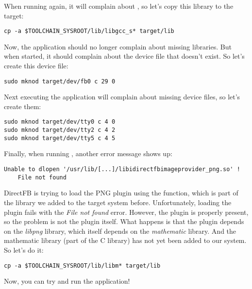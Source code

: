 When running  again, it will complain about
, so let's copy this library to the target:

\begin{verbatim}
cp -a $TOOLCHAIN_SYSROOT/lib/libgcc_s* target/lib
\end{verbatim}

Now, the application should no longer complain about missing
libraries. But when started, it should complain about the 
device file that doesn't exist. So let's create this device file:

\begin{verbatim}
sudo mknod target/dev/fb0 c 29 0
\end{verbatim}

Next executing the application will complain about missing
 device files, so let's create them:

\begin{verbatim}
sudo mknod target/dev/tty0 c 4 0
sudo mknod target/dev/tty2 c 4 2
sudo mknod target/dev/tty5 c 4 5
\end{verbatim}

Finally, when running , another error message shows up:

\small
\begin{verbatim}
Unable to dlopen '/usr/lib/[...]/libidirectfbimageprovider_png.so' !
	File not found
\end{verbatim}
\normalsize

DirectFB is trying to load the PNG plugin using the  function,
which is part of the  library we added to the target system
before. Unfortunately, loading the plugin fails with the {\em File not
found} error. However, the plugin is properly present, so the problem
is not the plugin itself. What happens is that the plugin depends on
the {\em libpng} library, which itself depends on the {\em mathematic}
library. And the mathematic library  (part of the C library) has
not yet been added to our system. So let's do it:

\begin{verbatim}
cp -a $TOOLCHAIN_SYSROOT/lib/libm* target/lib
\end{verbatim}

Now, you can try and run the  application!
